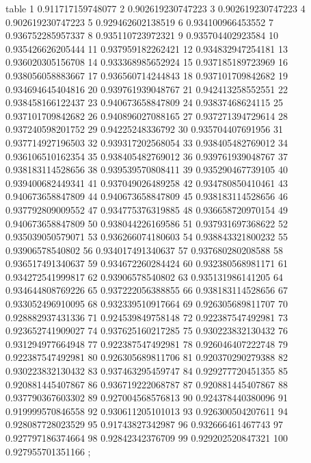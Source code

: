 table {%
	1 0.911717159748077
	2 0.902619230747223
	3 0.902619230747223
	4 0.902619230747223
	5 0.929462602138519
	6 0.934100966453552
	7 0.936752285957337
	8 0.935110723972321
	9 0.935704402923584
	10 0.935426626205444
	11 0.937959182262421
	12 0.934832947254181
	13 0.936020305156708
	14 0.933368985652924
	15 0.937185189723969
	16 0.938056058883667
	17 0.936560714244843
	18 0.937101709842682
	19 0.934694645404816
	20 0.939761939048767
	21 0.942413258552551
	22 0.938458166122437
	23 0.940673658847809
	24 0.93837468624115
	25 0.937101709842682
	26 0.940896027088165
	27 0.937271394729614
	28 0.937240598201752
	29 0.94225248336792
	30 0.935704407691956
	31 0.937714927196503
	32 0.939317202568054
	33 0.938405482769012
	34 0.936106510162354
	35 0.938405482769012
	36 0.939761939048767
	37 0.938183114528656
	38 0.939539570808411
	39 0.935290467739105
	40 0.939400682449341
	41 0.937049026489258
	42 0.934780850410461
	43 0.940673658847809
	44 0.940673658847809
	45 0.938183114528656
	46 0.937792809009552
	47 0.934775376319885
	48 0.936658720970154
	49 0.940673658847809
	50 0.938044226169586
	51 0.937931697368622
	52 0.935039050579071
	53 0.936266074180603
	54 0.938843321800232
	55 0.93906578540802
	56 0.934017491340637
	57 0.937680280208588
	58 0.936517491340637
	59 0.934672260284424
	60 0.932380568981171
	61 0.934272541999817
	62 0.93906578540802
	63 0.935131986141205
	64 0.934644808769226
	65 0.937222056388855
	66 0.938183114528656
	67 0.933052496910095
	68 0.932339510917664
	69 0.926305689811707
	70 0.928882937431336
	71 0.924539849758148
	72 0.922387547492981
	73 0.923652741909027
	74 0.937625160217285
	75 0.930223832130432
	76 0.931294977664948
	77 0.922387547492981
	78 0.926046407222748
	79 0.922387547492981
	80 0.926305689811706
	81 0.920370290279388
	82 0.930223832130432
	83 0.937463295459747
	84 0.929277720451355
	85 0.920881445407867
	86 0.936719222068787
	87 0.920881445407867
	88 0.937790367603302
	89 0.927004568576813
	90 0.924378440380096
	91 0.919999570846558
	92 0.930611205101013
	93 0.926300504207611
	94 0.928087728023529
	95 0.91743827342987
	96 0.932666461467743
	97 0.927797186374664
	98 0.92842342376709
	99 0.929202520847321
	100 0.927955701351166
};
